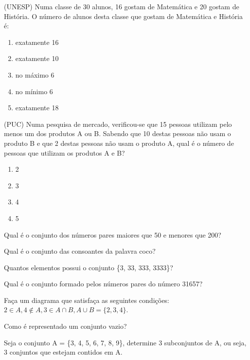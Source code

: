 		\item (UNESP) Numa classe de 30 alunos, 16 gostam de Matemática e 20 gostam de História. O número de alunos desta classe que gostam de Matemática e História é:
		\begin{multicols}{3}
		\begin{enumerate}
			\item exatamente 16
			\item exatamente 10
			\item no máximo 6	
			\item no mínimo 6
			\item exatamente 18
		\end{enumerate}
		\end{multicols}

		\item (PUC) Numa pesquisa de mercado, verificou-se que 15 pessoas utilizam pelo menos um dos produtos A ou B. Sabendo que 10 destas pessoas não usam o produto B e que 2 destas pessoas não usam o produto A, qual é o número de pessoas que utilizam os produtos A e B?
		\begin{multicols}{4}
		\begin{enumerate}
			\item 2
			\item 3
			\item 4	
			\item 5 
		\end{enumerate}
		\end{multicols}
	\item Qual é o conjunto dos números pares maiores que 50 e menores que 200?

	\item Qual é o conjunto das consoantes da palavra coco?

	\item Quantos elementos possui o conjunto \{3, 33, 333, 3333\}?

	\item Qual é o conjunto formado pelos números pares do número 31657?

	\item Faça um diagrama que satisfaça as seguintes condições: $2\in A, 4\notin A, 3\in A\cap B, A\cup B =\{2, 3, 4\}$.

	\item Como é representado um conjunto vazio?

	\item Seja o conjunto A = \{3, 4, 5, 6, 7, 8, 9\}, determine 3 subconjuntos de A, ou seja, 3 conjuntos que estejam contidos em A.

